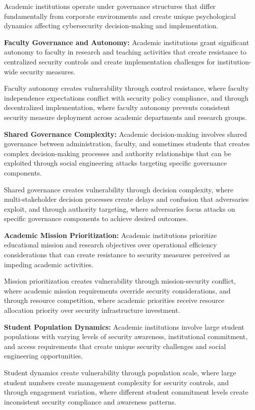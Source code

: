 \documentclass[10pt, twocolumn]{article}
\begin{document}
Academic institutions operate under governance structures that differ fundamentally from corporate environments and create unique psychological dynamics affecting cybersecurity decision-making and implementation.

\textbf{Faculty Governance and Autonomy:} Academic institutions grant significant autonomy to faculty in research and teaching activities that create resistance to centralized security controls and create implementation challenges for institution-wide security measures.

Faculty autonomy creates vulnerability through control resistance, where faculty independence expectations conflict with security policy compliance, and through decentralized implementation, where faculty autonomy prevents consistent security measure deployment across academic departments and research groups.

\textbf{Shared Governance Complexity:} Academic decision-making involves shared governance between administration, faculty, and sometimes students that creates complex decision-making processes and authority relationships that can be exploited through social engineering attacks targeting specific governance components.

Shared governance creates vulnerability through decision complexity, where multi-stakeholder decision processes create delays and confusion that adversaries exploit, and through authority targeting, where adversaries focus attacks on specific governance components to achieve desired outcomes.

\textbf{Academic Mission Prioritization:} Academic institutions prioritize educational mission and research objectives over operational efficiency considerations that can create resistance to security measures perceived as impeding academic activities.

Mission prioritization creates vulnerability through mission-security conflict, where academic mission requirements override security considerations, and through resource competition, where academic priorities receive resource allocation priority over security infrastructure investment.

\textbf{Student Population Dynamics:} Academic institutions involve large student populations with varying levels of security awareness, institutional commitment, and access requirements that create unique security challenges and social engineering opportunities.

Student dynamics create vulnerability through population scale, where large student numbers create management complexity for security controls, and through engagement variation, where different student commitment levels create inconsistent security compliance and awareness patterns.
\end{document}

